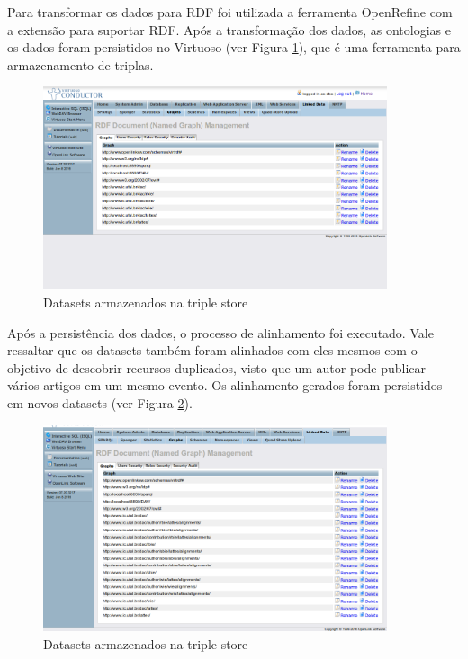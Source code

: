 Para transformar os dados para RDF foi utilizada a ferramenta OpenRefine com a extensão para suportar RDF. Após a transformação dos dados, as ontologias e os dados foram persistidos no Virtuoso (ver Figura \ref{fig:datasets}), que é uma ferramenta para armazenamento de triplas.

\begin{figure}[!ht]
	\centering
	\includegraphics[width=0.9\textwidth]{./imagens/datasets.png}
    \caption{Datasets armazenados na triple store}
	\label{fig:datasets}
\end{figure}

Após a persistência dos dados, o processo de alinhamento foi executado. Vale ressaltar que os datasets também foram alinhados com eles mesmos com o objetivo de descobrir recursos duplicados, visto que um autor pode publicar vários artigos em um mesmo evento. Os alinhamento gerados foram persistidos em novos datasets (ver Figura \ref{fig:datasets_alingments}).

\begin{figure}[!ht]
	\centering
	\includegraphics[width=0.9\textwidth]{./imagens/datasets-alinhamento.png}
    \caption{Datasets armazenados na triple store}
	\label{fig:datasets_alingments}
\end{figure}

